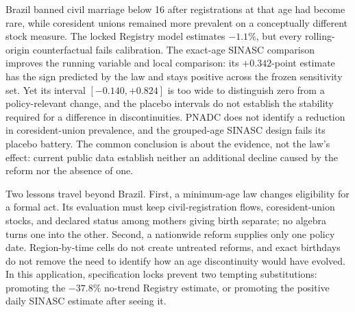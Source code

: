 \documentclass[12pt]{article}
\begin{document}
Brazil banned civil marriage below 16 after registrations at that age had become rare,
while coresident unions remained more prevalent on a conceptually different stock
measure. The locked Registry model estimates $-1.1\%$, but every rolling-origin
counterfactual fails calibration. The exact-age SINASC comparison improves the running
variable and local comparison: its $+0.342$-point estimate has the sign predicted by the
law and stays positive across the frozen sensitivity set. Yet its interval
$[-0.140,+0.824]$ is too wide to distinguish zero from a policy-relevant change, and
the placebo intervals do not establish the stability required for a difference in
discontinuities. PNADC does not identify a reduction in coresident-union prevalence, and
the grouped-age SINASC design fails its placebo battery. The common conclusion is about
the evidence, not the law's effect: current public data establish neither an additional
decline caused by the reform nor the absence of one.

Two lessons travel beyond Brazil. First, a minimum-age law changes eligibility for a
formal act. Its evaluation must keep civil-registration flows, coresident-union stocks,
and declared status among mothers giving birth separate; no algebra turns one into the
other. Second, a nationwide reform supplies only one policy date. Region-by-time cells
do not create untreated reforms, and exact birthdays do not remove the need to identify
how an age discontinuity would have evolved. In this application, specification locks
prevent two tempting substitutions: promoting the $-37.8\%$ no-trend Registry estimate,
or promoting the positive daily SINASC estimate after seeing it.
\end{document}
